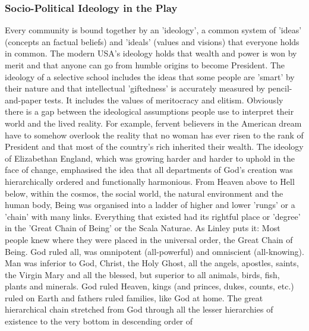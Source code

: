 		\subsubsection{Socio-Political Ideology in the Play}
			Every community is bound together by an 'ideology', a common system of 'ideas' (concepts an factual beliefs) and 'ideals' (values and visions) that everyone holds in common. The modern USA's ideology holds that wealth and power is won by merit and that anyone can go from humble origins to become President. The ideology of a selective school includes the ideas that some people are 'smart' by their nature and that intellectual 'giftedness' is accurately measured by pencil-and-paper tests. It includes the values of meritocracy and elitism. Obviously there is a gap between the ideological assumptions people use to interpret their world and the lived reality. For example, fervent believers in the American dream have to somehow overlook the reality that no woman has ever risen to the rank of President and that most of the country's rich inherited their wealth. The ideology of Elizabethan England, which was growing harder and harder to uphold in the face of change, emphasised the idea that all departments of God's creation was hierarchically ordered and functionally harmonious. From Heaven above to Hell below, within the cosmos, the social world, the natural environment and the human body, Being was organised into a ladder of higher and lower 'rungs' or a 'chain' with many links. Everything that existed had its rightful place or 'degree' in the 'Great Chain of Being' or the Scala Naturae. As Linley puts it: Most people knew where they were placed in the universal order, the Great Chain of Being. God ruled all, was omnipotent (all-powerful) and omniscient (all-knowing). Man was inferior to God, Christ, the Holy Ghost, all the angels, apostles, saints, the Virgin Mary and all the blessed, but superior to all animals, birds, fish, plants and minerals. God ruled Heaven, kings (and princes, dukes, counts, etc.) ruled on Earth and fathers ruled families, like God at home. The great hierarchical chain stretched from God through all the lesser hierarchies of existence to the very bottom in descending order of 
